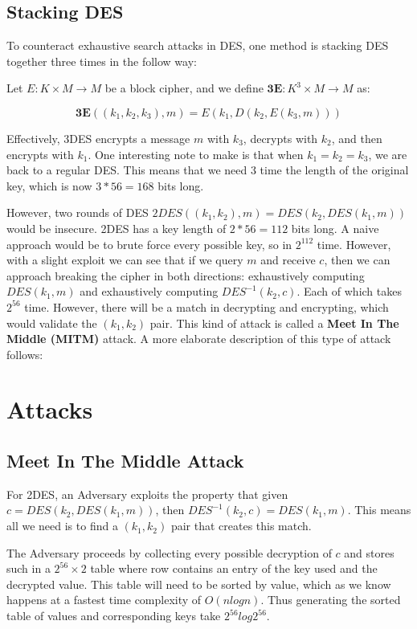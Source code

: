 \documentclass{article}
\begin{document}
\begin{multicols}{2}
\subsection{Stacking DES}

To counteract exhaustive search attacks in DES, one method is stacking DES together three times in the follow way:

Let $E: K \times M \rightarrow M$ be a block cipher, and we define $\mathbf{3E} : K^3 \times M \rightarrow M$ as:

$$
\mathbf{3E}((k_1,k_2,k_3), m) = E(k_1, D(k_2, E(k_3, m)))
$$

Effectively, 3DES encrypts a message $m$ with $k_3$, decrypts with $k_2$, and then encrypts with $k_1$. One interesting note to make is that when $k_1 = k_2 = k_3$, we are back to a regular DES. This means that we need 3 time the length of the original key, which is now $3*56 = 168$ bits long.

However, two rounds of DES $2DES((k_1, k_2),m) = DES(k_2,DES(k_1,m))$ would be insecure. 2DES has a key length of $2*56 = 112$ bits long. A naive approach would be to brute force every possible key, so in $2^{112}$ time. However, with a slight exploit we can see that if we query $m$ and receive $c$, then we can approach breaking the cipher in both directions: exhaustively computing $DES(k_1,m)$ and exhaustively computing $DES^{-1}(k_2,c)$. Each of which takes $2^{56}$ time. However, there will be a match in decrypting and encrypting, which would validate the $(k_1, k_2)$ pair. This kind of attack is called a \textbf{Meet In The Middle (MITM)} attack. A more elaborate description of this type of attack follows:

\section{Attacks}

\subsection{Meet In The Middle Attack}

For 2DES, an Adversary exploits the property that given $c = DES(k_2,DES(k_1,m))$, then $DES^{-1}(k_2,c) = DES(k_1,m)$. This means all we need is to find a $(k_1, k_2)$ pair that creates this match.

The Adversary proceeds by collecting every possible decryption of $c$ and stores such in a $2^{56} \times 2$ table where row contains an entry of the key used and the decrypted value. This table will need to be sorted by value, which as we know happens at a fastest time complexity of $O(nlogn)$. Thus generating the sorted table of values and corresponding keys take $2^{56}log2^{56}$. 


\end{multicols}
\end{document}
